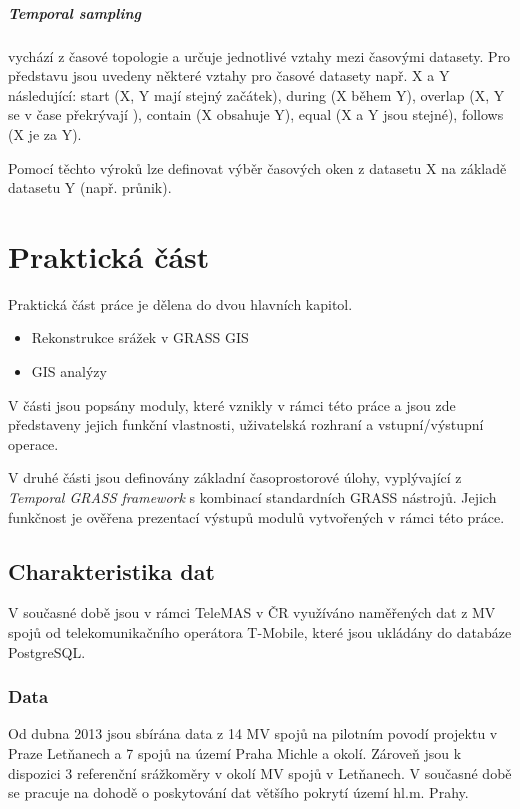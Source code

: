 \documentclass[a4paper,12pt,oneside]{report}
\begin{document}
\paragraph*{Temporal sampling} vychází z časové topologie a určuje
jednotlivé vztahy mezi časovými datasety. Pro představu jsou uvedeny
některé vztahy pro časové datasety např. X a Y následující: start
(X, Y mají stejný začátek), during (X během Y), overlap (X, Y se v
čase překrývají ), contain (X obsahuje Y), equal (X a Y jsou stejné),
follows (X je za Y).

Pomocí těchto výroků lze definovat výběr časových oken z datasetu X
na základě datasetu Y (např. průnik).



\newpage
\setcounter{footnote}{1}
\chapter*{Praktická část}


Praktická část práce je dělena do dvou hlavních kapitol.

\begin{itemize}
\item Rekonstrukce srážek v GRASS GIS
\item GIS analýzy
\end{itemize}


V části jsou popsány moduly, které vznikly v rámci této práce a jsou zde představeny jejich funkční vlastnosti, uživatelská rozhraní a  vstupní/výstupní operace.

V druhé části  jsou definovány základní časoprostorové úlohy,
vyplývající z \textit{Temporal GRASS framework} s kombinací
standardních GRASS nástrojů. Jejich funkčnost je ověřena  prezentací výstupů modulů vytvořených v rámci této práce. 

\setcounter{footnote}{1}
\section{Charakteristika dat}
V současné době jsou v rámci  TeleMAS v ČR využíváno naměřených dat z MV spojů od telekomunikačního
operátora T-Mobile, které jsou ukládány do databáze PostgreSQL.

\subsection*{Data}  
 
Od dubna 2013 jsou sbírána data z 14 MV spojů na pilotním povodí
projektu v Praze Letňanech a 7 spojů na území Praha Michle a
okolí. Zároveň jsou k dispozici 3 referenční srážkoměry v okolí MV
spojů v Letňanech.  V současné době se pracuje na dohodě o poskytování
dat většího pokrytí území hl.m. Prahy.
\end{document}
